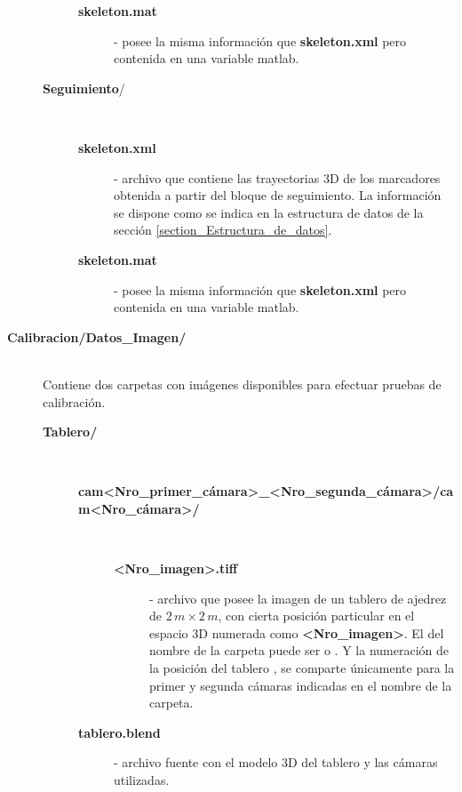 \begin{description}
\begin{description}
\begin{description}
			\item[{\small\textbf{\textsf{skeleton.mat}}}] - posee la misma información que {\small\textbf{\textsf{skeleton.xml}}} pero contenida en una variable matlab.
		\end{description}
	\item[{\small\textbf{\textsf{Seguimiento}}}/] \hfill \\ \vspace{-0.5cm}
		\begin{description}
				\item[{\small\textbf{\textsf{skeleton.xml}}}] - archivo que contiene las trayectorias 3D de los marcadores obtenida a partir del bloque de seguimiento. La información se dispone como se indica en la estructura de datos de la sección \ref{section_Estructura_de_datos}. 
				\item[{\small\textbf{\textsf{skeleton.mat}}}] - posee la misma información que {\small\textbf{\textsf{skeleton.xml}}} pero contenida en una variable matlab.
		\end{description}
	\end{description}
\item[{\small\textbf{\textsf{Calibracion/Datos\_Imagen/}}}] \hfill \\
Contiene dos carpetas con imágenes disponibles para efectuar pruebas de calibración.\vspace{-0.2cm}
	\begin{description}			
			\item[{\small\textbf{\textsf{Tablero/}}}]\hfill \\ \vspace{-0.5cm}		
			\begin{description}
					\item[{\small\textbf{\textsf{cam<Nro\_primer\_cámara>\_<Nro\_segunda\_cámara>/cam<Nro\_cámara>/}}}] \hfill \\ \vspace{-0.5cm}
								\begin{description}
									\item[{\small\textbf{\textsf{<Nro\_imagen>.tiff}}}] - archivo que posee la imagen de un tablero de ajedrez de $2\,m  \times 2\,m$, con cierta posición particular en el espacio 3D numerada como {\small\textbf{\textsf{<Nro\_imagen>}}}. 
									 El   del nombre de la carpeta puede ser 
									   o . Y la numeración de la posición del tablero  ,  se comparte únicamente para la primer y segunda cámaras indicadas en el nombre de la carpeta.
								\end{description} 
					\item[{\small\textbf{\textsf{tablero.blend}}}] - archivo fuente con el modelo 3D del tablero y las cámaras utilizadas.						 
			\end{description}
				    					

\end{description}
\end{description}

